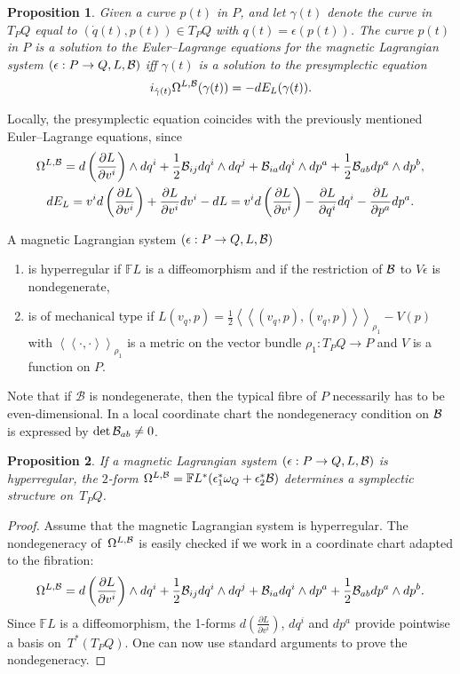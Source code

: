 \documentclass[11pt]{article}
\newtheorem{proposition}{Proposition}
\renewcommand{\ll}{\left<\!\left<}
\renewcommand{\gg}{\right>\!\right>}
\newcommand{\B}{{\cal B}}
\newcommand{\e}{\epsilon}
\def\fpd#1#2{\frac{\partial #1}{\partial #2}}
\newcommand{\F}{\mathbb{F}}
\begin{document}
\begin{proposition}\label{def:el} Given a curve $p(t)$ in $P$, and let $\gamma(t)$ denote the curve in $T_PQ$ equal to $(\dot q(t), p(t))\in T_PQ$ with $q(t)=\e(p(t))$. The curve $p(t)$ in $P$ is a solution to the Euler--Lagrange equations for the magnetic Lagrangian system $(\e:P\to Q,L,\B)$ iff  $\gamma(t)$ is a solution to the presymplectic equation
\[i_{\dot \gamma(t)} \Omega^{L,\B} (\gamma(t)) = -dE_L(\gamma(t)).\]
\end{proposition}
Locally, the presymplectic equation coincides with the previously mentioned Euler--Lagrange equations, since
\begin{gather*}
\Omega^{L,\B}  = d\left(\fpd{L}{v^i} \right)\wedge d q^i + \frac12 \B_{ij} dq^i \wedge dq^j + \B_{ia}dq^i\wedge dp^a + \frac12 \B_{ab} dp^a\wedge dp^b,\\
 dE_L   =v^i d\left(\fpd{L}{v^i} \right) + \fpd{L}{v^i} dv^i - dL=v^i d\left(\fpd{L}{v^i} \right) - \fpd{L}{q^i} dq^i - \fpd{L}{p^a} dp^a.
\end{gather*}

\begin{definition}A magnetic Lagrangian system $(\e:P\to Q,L,\B)$
\begin{enumerate}\itemsep=0pt \item[1)] is hyperregular if $\F L$ is  a dif\/feomorphism and if the restriction of $\B$ to $V\e$ is nondegenerate,
 \item[2)] is of mechanical type if $L(v_q,p)= \frac12 \ll (v_q,p) ,(v_q,p)\gg_{\rho_1}- V(p)$ with $\ll \cdot , \cdot \gg_{\rho_1}$ is a metric on the vector bundle $\rho_1:T_PQ \to P$ and $V$ is a function on $P$. \end{enumerate}
\end{definition}

Note that if $\mathcal{B}$ is nondegenerate, then the typical f\/ibre of $P$ necessarily has to be even-dimensional.
In a local coordinate chart the nondegeneracy condition on $\B$ is expressed by $\det \B_{ab}\neq0$.
\begin{proposition} If a magnetic Lagrangian system $(\e:P\to Q,L,\B)$ is hyperregular, the $2$-form $\Omega^{L,\B} = \F L^*(\e^*_1\omega_{Q} +\e^*_2\B)$ determines a symplectic structure on~$T_PQ$.
\end{proposition}
\begin{proof}
Assume that the magnetic Lagrangian system is hyperregular. The nondegeneracy of~$\Omega^{L,\B}$ is easily checked if we work in a coordinate chart adapted to the f\/ibration:
\[
\Omega^{L,\B} = d\left(\fpd{L}{v^i} \right)\wedge d q^i + \frac12 \B_{ij} dq^i \wedge dq^j + \B_{ia}dq^i\wedge dp^a + \frac12 \B_{ab} dp^a\wedge dp^b.
\]
Since $\F L$ is a dif\/feomorphism, the 1-forms $d\left(\fpd{L}{v^i} \right)$, $dq^i$ and $dp^a$ provide pointwise a basis on~$T^*(T_PQ)$. One can now use standard arguments to prove the nondegeneracy.
\end{proof}
\end{document}
